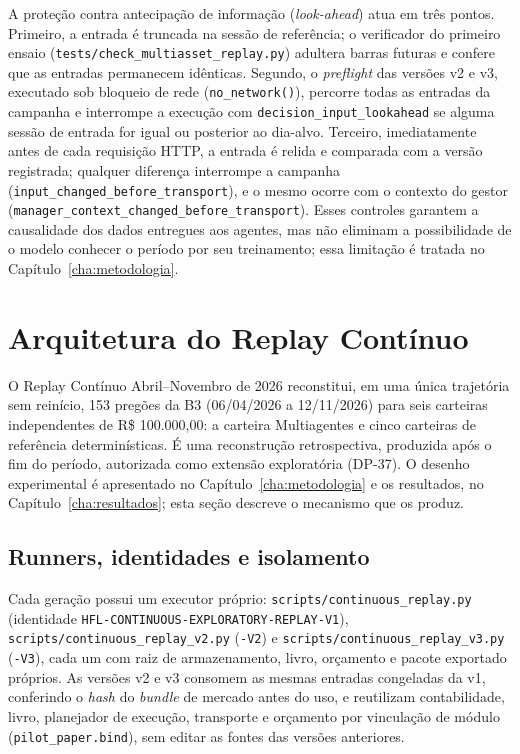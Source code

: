A proteção contra antecipação de informação (\textit{look-ahead}) atua em três pontos. Primeiro, a entrada é truncada na sessão de referência; o verificador do primeiro ensaio (\texttt{tests/check\_multiasset\_replay.py}) adultera barras futuras e confere que as entradas permanecem idênticas. Segundo, o \textit{preflight} das versões v2 e v3, executado sob bloqueio de rede (\texttt{no\_network()}), percorre todas as entradas da campanha e interrompe a execução com \texttt{decision\_input\_lookahead} se alguma sessão de entrada for igual ou posterior ao dia-alvo. Terceiro, imediatamente antes de cada requisição HTTP, a entrada é relida e comparada com a versão registrada; qualquer diferença interrompe a campanha (\texttt{input\_changed\_before\_transport}), e o mesmo ocorre com o contexto do gestor (\texttt{manager\_context\_changed\_before\_transport}). Esses controles garantem a causalidade dos dados entregues aos agentes, mas não eliminam a possibilidade de o modelo conhecer o período por seu treinamento; essa limitação é tratada no Capítulo~\ref{cha:metodologia}.

\section{Arquitetura do Replay Contínuo}
\label{sec:arq-replay}

O Replay Contínuo Abril--Novembro de 2026 reconstitui, em uma única trajetória sem reinício, 153 pregões da B3 (06/04/2026 a 12/11/2026) para seis carteiras independentes de R\$ 100.000,00: a carteira Multiagentes e cinco carteiras de referência determinísticas. É uma reconstrução retrospectiva, produzida após o fim do período, autorizada como extensão exploratória (DP-37). O desenho experimental é apresentado no Capítulo~\ref{cha:metodologia} e os resultados, no Capítulo~\ref{cha:resultados}; esta seção descreve o mecanismo que os produz.

\subsection{Runners, identidades e isolamento}

Cada geração possui um executor próprio: \texttt{scripts/continuous\_replay.py} (identidade \texttt{HFL-CONTINUOUS-EXPLORATORY-REPLAY-V1}), \texttt{scripts/continuous\_replay\_v2.py} (\texttt{-V2}) e \texttt{scripts/continuous\_replay\_v3.py} (\texttt{-V3}), cada um com raiz de armazenamento, livro, orçamento e pacote exportado próprios. As versões v2 e v3 consomem as mesmas entradas congeladas da v1, conferindo o \textit{hash} do \textit{bundle} de mercado antes do uso, e reutilizam contabilidade, livro, planejador de execução, transporte e orçamento por vinculação de módulo (\texttt{pilot\_paper.bind}), sem editar as fontes das versões anteriores.

